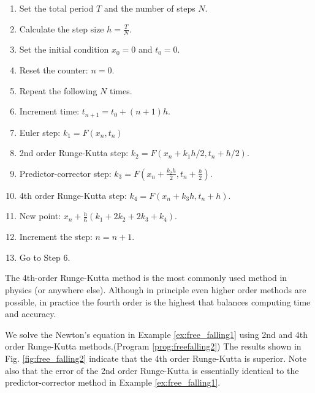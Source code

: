 \bigskip
\begin{myalgobox}
	\label{algo:runge-kutta4}

	\medskip			
	\begin{minipage}{5.5in}
		\begin{enumerate}
			\item Set the total period $T$ and the number of steps $N$.
			\item Calculate the step size $h=\displaystyle\frac{T}{N}$.
			\item Set the initial condition $x_0=0$ and $t_0=0$.
			\item Reset the counter: $n=0$.
			\item Repeat the following $N$ times.
			\item Increment time: $t_{n+1}=t_0 + (n+1)h$.
			\item Euler step: $k_1 = F(x_n,t_n)$			
			\item 2nd order Runge-Kutta step: $k_2 = F(x_n+k_1 h/2,t_{n}+h/2) $.
			\item Predictor-corrector step: $k_3  =  F(x_n + \frac{k_2 h}{2}, t_n + \frac{h}{2} )$.
			\item 4th order Runge-Kutta step: $k_4  =  F(x_n + k_3 h, t_n + h) $.
			\item New point: $x_n +\displaystyle\frac{h}{6} ( k_1 + 2 k_2 + 2 k_3 + k_4 )$.
			\item Increment the step: $n=n+1$.
			\item Go to Step 6.
		\end{enumerate}
	\end{minipage}
\end{myalgobox}


\bigskip
The 4th-order Runge-Kutta method is the most commonly used method in physics (or anywhere else).
Although in principle even higher order methods are possible, in practice
the fourth order is the highest that balances computing time and accuracy.

\begin{example}\label{ex:free_falling2}  
We solve the Newton's equation in Example \ref{ex:free_falling1} using 2nd and 4th order Runge-Kutta methods.(Program \ref{prog:freefalling2})
The results shown in Fig. \ref{fig:free_falling2} indicate that the 4th order Runge-Kutta is superior.  Note also that the error of the 2nd order Runge-Kutta is essentially identical to the predictor-corrector method in Example \ref{ex:free_falling1}.
\end{example}

